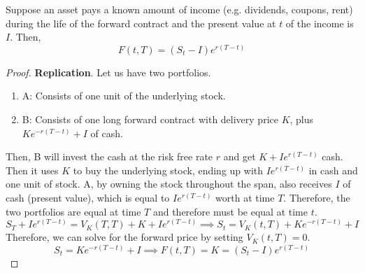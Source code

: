 \documentclass{article}
\begin{document}
    \begin{theorem}
      \label{thm:forward-price-of-income-asset}
      Suppose an asset pays a known amount of income (e.g. dividends, coupons, rent) during the life of the forward contract and the present value at $t$ of the income is $I$. Then, 
      \begin{equation}
        F(t, T) = (S_t - I)e^{r(T - t)}
      \end{equation}
    \end{theorem}
    \begin{proof}
      \textbf{Replication}. Let us have two portfolios. 
      \begin{enumerate}
        \item A: Consists of one unit of the underlying stock. 
        \item B: Consists of one long forward contract with delivery price $K$, plus $K e^{-r(T - t)} + I$ of cash. 
      \end{enumerate}
      Then, B will invest the cash at the risk free rate $r$ and get $K + I e^{r(T - t)}$ cash. Then it uses $K$ to buy the underlying stock, ending up with $I e^{r(T - t)}$ in cash and one unit of stock. A, by owning the stock throughout the span, also receives $I$ of cash (present value), which is equal to $I e^{r(T - t)}$ worth at time $T$. Therefore, the two portfolios are equal at time $T$ and therefore must be equal at time $t$. 
      \begin{equation}
        S_T + I e^{r(T - t)} = V_K (T, T) + K + I e^{r(T - t)} \implies S_t = V_K (t, T) + K e^{-r(T - t)} + I
      \end{equation}
      Therefore, we can solve for the forward price by setting $V_K(t, T) = 0$. 
      \begin{equation}
        S_t = K e^{-r(T - t)} + I \implies F(t, T) = K = (S_t - I) e^{r(T - t)}
      \end{equation}
    \end{proof}
\end{document}
